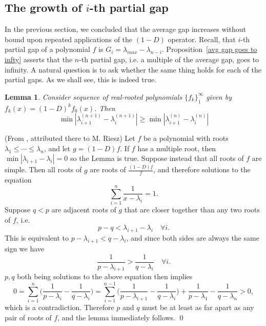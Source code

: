 \documentclass[11pt]{article}
\newtheorem{lemma}[theorem]{Lemma}
\begin{document}
\subsection{The growth of $i$-th partial gap}
In the previous section, we concluded that the average gap increases without bound upon repeated applications of the $(1-D)$ operator. Recall, that $i$-th partial gap of a polynomial $f$ is $G_i = \lambda_{max} - \lambda_{n-i}$. Proposition~\ref{avg gap goes to infty} asserts that the $n$-th partial gap, i.e. a multiple of the average gap, goes to infinity. A natural question is to ask whether the same thing holds for each of the partial gaps. As we shall see, this is indeed true.

\begin{lemma}
\label{minimal gap increases}
 Consider sequence of real-rooted polynomials $\{f_k\}_1^\infty$ given by $f_k(x) = (1-D)^k f_0(x)$. Then
 \[\min |\lambda^{(n+1)}_{i+1} - \lambda^{(n+1)}_i | \geq \min |\lambda^{(n)}_{i+1} - \lambda^{(n)}_i |\]
\end{lemma}
\proof (From \cite{diffspacing}, attributed there to M. Riesz) Let $f$ be a polynomial with roots $\lambda_1\leq\cdots\leq\lambda_n$, and let $g = (1-D)f$. If $f$ has a multiple root, then $\min |\lambda_{i+1}-\lambda_i| = 0$ so the Lemma is true. Suppose instead that all roots of $f$ are simple. Then all roots of $g$ are roots of $\frac{(1-D)f}{f}$, and therefore solutions to the equation
 \[ \sum_{i=1}^n \frac{1}{x-\lambda_i} = 1. \]
Suppose $q<p$ are adjacent roots of $g$ that are closer together than any two roots of $f$, i.e.
 \[ p - q < \lambda_{i+1}-\lambda_i \quad \forall i. \]
This is equivalent to $p-\lambda_{i+1}<q-\lambda_i$, and since both sides are always the same sign we have
 \[ \frac{1}{p-\lambda_{i+1}} > \frac{1}{q-\lambda_i} \quad \forall i. \]
$p,q$ both being solutions to the above equation then implies
 \[ 0 = \sum_{i=1}^n \Big(\frac{1}{p-\lambda_i} - \frac{1}{q-\lambda_i}\Big) = \sum_{i=1}^{n-1}\Big(\frac{1}{p-\lambda_{i+1}} - \frac{1}{q-\lambda_i}\Big) + \frac{1}{p-\lambda_1} - \frac{1}{q-\lambda_n} > 0, \]
which is a contradiction. Therefore $p$ and $q$ must be at least as far apart as any pair of roots of $f$, and the lemma immediately follows.
\qed
\end{document}
